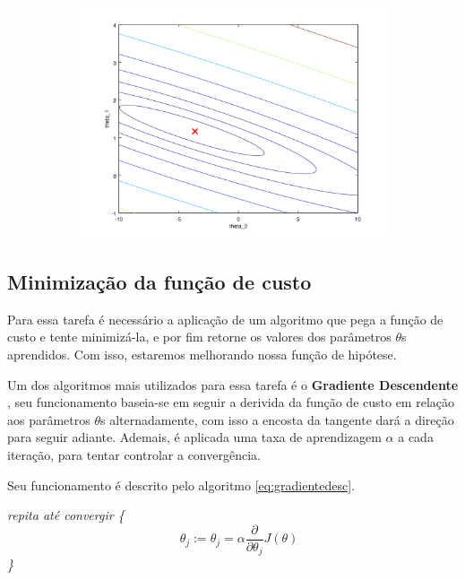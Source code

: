 \begin{figure}
\begin{subfigure}[htb]{0.5\textwidth}
    \includegraphics[width=\textwidth]{img/funcaodecustocontorno} 
  \end{subfigure} 

\end{figure}


\subsection{Minimização da função de custo}

Para essa tarefa é necessário a aplicação de um algoritmo que pega a função de custo e tente minimizá-la, e por fim retorne os valores dos parâmetros $ \theta $s aprendidos. Com isso, estaremos melhorando nossa função de hipótese. 

Um dos algoritmos mais utilizados para essa tarefa é o \textbf{Gradiente Descendente} \cite{michalski2013machine}, seu funcionamento baseia-se em seguir a derivida da função de custo em relação aos parâmetros $\theta$s alternadamente, com isso a encosta da tangente dará a direção para seguir adiante. Ademais, é aplicada uma taxa de aprendizagem $ \alpha $ a cada iteração, para tentar controlar a convergência.

Seu funcionamento é descrito pelo algoritmo \ref{eq:gradientedesc}.

\textit{repita até convergir \{}
\begin{equation}
\label{eq:gradientedesc}
\quad \theta_j := \theta_j = \alpha \frac{\partial}{\partial\theta_j} J(\theta)
\end{equation}
\textit{\quad\quad\quad \}}

